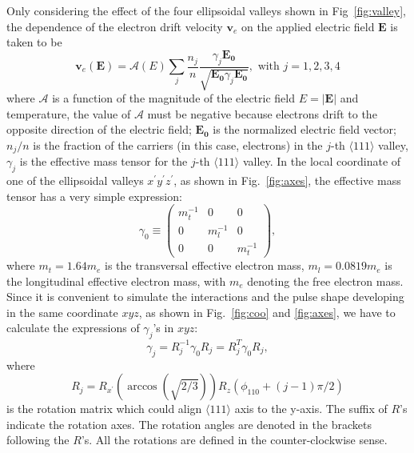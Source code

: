 Only considering the effect of the four ellipsoidal valleys shown in Fig~\ref{fig:valley}, the dependence of the electron drift velocity $\mathbf{v}_{e}$ on the applied electric field $\mathbf{E}$ is taken to be
\begin{equation}
  \label{eq:ed}
  \mathbf{v}_{e}(\mathbf{E}) = \mathcal{A}(E) \sum_{j}     \frac{n_{j}}{n} \frac{\gamma_{j}\mathbf{E_{0}}}           {\sqrt{\mathbf{E_{0}}\gamma_{j}\mathbf{E_{0}}}}, \mbox{ with }           j=1,2,3,4
\end{equation}
where $\mathcal{A}$ is a function of the magnitude of the electric field $E=|\mathbf{E}|$ and temperature, the value of $\mathcal{A}$ must be negative because electrons drift to the opposite direction of the electric field; $\mathbf{E_{0}}$ is the normalized electric field vector; $n_{j}/n$ is the fraction of the carriers (in this case, electrons) in the $j$-th $\langle111\rangle$ valley, $\gamma_{j}$ is the effective mass tensor for the $j$-th $\langle111\rangle$ valley. In the local coordinate of one of the ellipsoidal valleys $x^{\prime}y^{\prime}z^{\prime}$, as shown in Fig.~\ref{fig:axes}, the effective mass tensor has a very simple expression:
\begin{equation}
  \label{eq:gamma0}
  \gamma_{0} \equiv \left(
    \begin{array}{ccc}
      m_{t}^{-1} & 0 & 0 \\
      0 & m_{l}^{-1} & 0 \\
      0 & 0 & m_{t}^{-1}
    \end{array} \right),
\end{equation}
where $m_{t} = 1.64m_{e}$ is the transversal effective electron mass, $m_{l} = 0.0819m_{e}$ is the longitudinal effective electron mass, with $m_{e}$ denoting the free electron mass. Since it is convenient to simulate the interactions and the pulse shape developing in the same coordinate $xyz$, as shown in Fig.~\ref{fig:coo} and \ref{fig:axes}, we have to calculate the expressions of $\gamma_{j}$'s in $xyz$:
\begin{equation}
  \label{eq:gammas}
  \gamma_{j} = R_{j}^{-1}\gamma_{0}R_{j} = R_{j}^{T}\gamma_{0}R_{j},
\end{equation}
where
\begin{equation}
  \label{eq:rs}
  R_{j} = R_{x^{\prime}}(\arccos(\sqrt{2/3}))R_{z}(\phi_{110}+(j-1)\pi/2)
\end{equation}
is the rotation matrix which could align $\langle111\rangle$ axis to the y-axis. The suffix of $R$'s indicate the rotation axes. The rotation angles are denoted in the brackets following the $R$'s. All the rotations are defined in the counter-clockwise sense.

